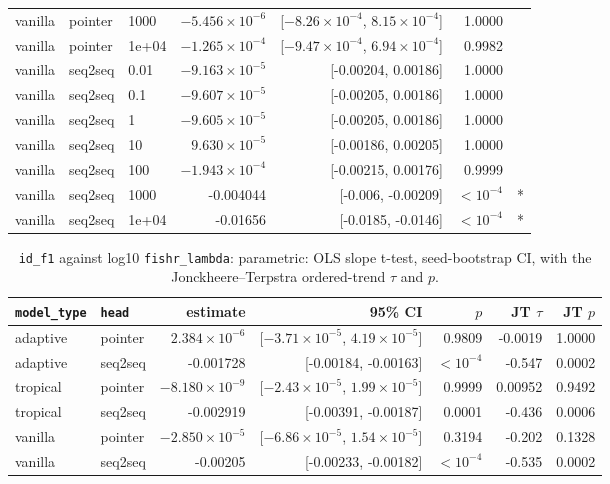 \documentclass[10pt]{article}
\begin{document}
{\begin{longtable}{lllrrrl}
vanilla & pointer & 1000 & $-5.456\times10^{-6}$ & [$-8.26\times10^{-4}$, $8.15\times10^{-4}$] & 1.0000 & \\
vanilla & pointer & 1e+04 & $-1.265\times10^{-4}$ & [$-9.47\times10^{-4}$, $6.94\times10^{-4}$] & 0.9982 & \\
vanilla & seq2seq & 0.01 & $-9.163\times10^{-5}$ & [-0.00204, 0.00186] & 1.0000 & \\
vanilla & seq2seq & 0.1 & $-9.607\times10^{-5}$ & [-0.00205, 0.00186] & 1.0000 & \\
vanilla & seq2seq & 1 & $-9.605\times10^{-5}$ & [-0.00205, 0.00186] & 1.0000 & \\
vanilla & seq2seq & 10 & $9.630\times10^{-5}$ & [-0.00186, 0.00205] & 1.0000 & \\
vanilla & seq2seq & 100 & $-1.943\times10^{-4}$ & [-0.00215, 0.00176] & 0.9999 & \\
vanilla & seq2seq & 1000 & -0.004044 & [-0.006, -0.00209] & $<10^{-4}$ & *\\
vanilla & seq2seq & 1e+04 & -0.01656 & [-0.0185, -0.0146] & $<10^{-4}$ & *\\
\bottomrule
\end{longtable}
}

{\small
\begin{longtable}{llrrrrr}
\caption{\texttt{id\_f1} against log10 \texttt{fishr\_lambda}: parametric: OLS slope t-test, seed-bootstrap CI, with the Jonckheere--Terpstra ordered-trend $\tau$ and $p$.}\label{tab:trend-id_f1}\\
\toprule
\texttt{model\_type} & \texttt{head} & estimate & 95\% CI & $p$ & JT $\tau$ & JT $p$\\
\midrule
\endhead
adaptive & pointer & $2.384\times10^{-6}$ & [$-3.71\times10^{-5}$, $4.19\times10^{-5}$] & 0.9809 & -0.0019 & 1.0000\\
adaptive & seq2seq & -0.001728 & [-0.00184, -0.00163] & $<10^{-4}$ & -0.547 & 0.0002\\
tropical & pointer & $-8.180\times10^{-9}$ & [$-2.43\times10^{-5}$, $1.99\times10^{-5}$] & 0.9999 & 0.00952 & 0.9492\\
tropical & seq2seq & -0.002919 & [-0.00391, -0.00187] & 0.0001 & -0.436 & 0.0006\\
vanilla & pointer & $-2.850\times10^{-5}$ & [$-6.86\times10^{-5}$, $1.54\times10^{-5}$] & 0.3194 & -0.202 & 0.1328\\
vanilla & seq2seq & -0.00205 & [-0.00233, -0.00182] & $<10^{-4}$ & -0.535 & 0.0002\\
\bottomrule
\end{longtable}
}
\end{document}
